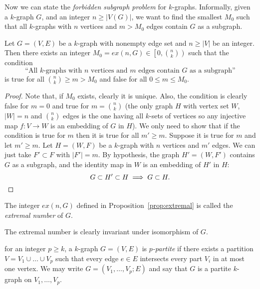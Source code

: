 Now we can state the \emph{forbidden subgraph problem} for $k$-graphs.
Informally, given a $k$-graph $G$, and an integer $n \geq |V(G)|$,
we want to find the smallest $M_0$ such that all $k$-graphs with $n$ vertices and $m > M_0$ edges
contain $G$ as a subgraph.

\begin{proposition} \label{prop:extremal}
    Let $G = (V, E)$ be a $k$-graph with nonempty edge set and $n \geq |V|$ be an integer.
    Then there exists an integer $M_0 = ex(n, G) \in \left[ 0, \binom{n}{k}\right)$ such that
    the condition
    \[
        \text{``All $k$-graphs with $n$ vertices and $m$ edges contain $G$ as a subgraph''}
    \]
    is true for all $\binom{n}{k} \geq m > M_0$ and false for all $0 \leq m \leq M_0$.

    \begin{proof}
        Note that, if $M_0$ exists, clearly it is unique.
        Also, the condition is clearly false for $m = 0$ and
        true for $m = \binom{n}{k}$
        (the only graph $H$ with vertex set $W$, $|W|=n$ and $\binom{n}{k}$ edges
        is the one having all $k$-sets of vertices so any injective map $f: V \to W$
        is an embedding of $G$ in $H$).
        We only need to show that if the condition is true for $m$ then it is true for
        all $m' \geq m$.
        Suppose it is true for $m$ and let $m' \geq m$.
        Let $H = (W, F)$ be a $k$-graph with $n$ vertices and $m'$ edges.
        We can just take $F' \subset F$ with $|F'| = m$.
        By hypothesis, the graph $H' = (W, F')$ contains $G$ as a subgraph,
        and the identity map in $W$ is an embedding of $H'$ in $H$:
        \[
            G \subset H' \subset H \implies G \subset H. \qedhere
        \]
    \end{proof}

\end{proposition}

\begin{definition}
    The integer $ex(n, G)$ defined in Proposition~\ref{prop:extremal}
    is called the \emph{extremal number} of $G$.
\end{definition}

\begin{remark}
    The extremal number is clearly invariant under isomorphism of $G$.
\end{remark}

\begin{definition}
    for an integer $p \geq k$, a $k$-graph $G = (V, E)$ is \emph{$p$-partite}
    if there exists a partition $V = V_1 \cup \dots \cup V_p$
    such that every edge $e \in E$ intersects every part $V_i$ in at most one vertex.
    We may write $G = (V_1, \dots, V_p; E)$ and say that
    $G$ is a partite $k$-graph on $V_1, \dots, V_p$.
\end{definition}


